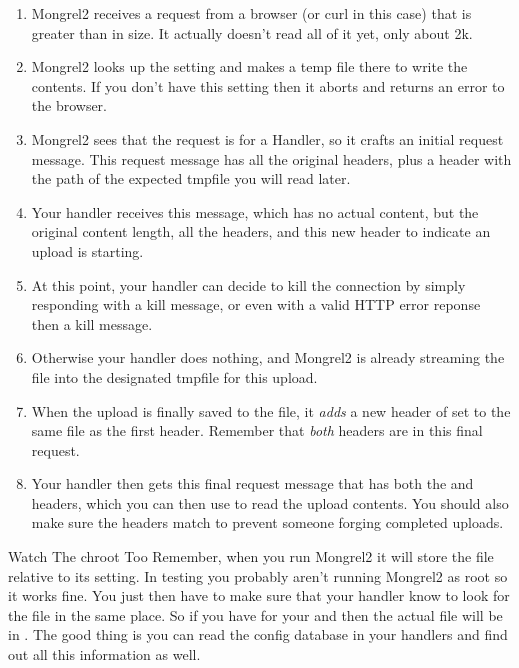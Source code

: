 \begin{enumerate}
\item Mongrel2 receives a request from a browser (or curl in this case) that is greater than  in size.  It actually doesn't read all of it yet, only about 2k.
\item Mongrel2 looks up the  setting and makes a temp file there to write the contents.  If you don't have this setting then it aborts and returns an error to the browser.
\item Mongrel2 sees that the request is for a Handler, so it crafts an initial request message.  This request message has all the original headers, plus a  header with the path of the expected tmpfile you will read later.
\item Your handler receives this message, which has no actual content, but the original content length, all the headers, and this new header to indicate an upload is starting.
\item At this point, your handler can decide to kill the connection by simply responding with a kill message, or even with a valid HTTP error reponse then a kill message.
\item Otherwise your handler does nothing, and Mongrel2 is already streaming the file into the designated tmpfile for this upload.
\item When the upload is finally saved to the file, it \emph{adds} a new header of  set to the same file as the first header.  Remember that \emph{both} headers are in this final request.
\item Your handler then gets this final request message that has both the  and  headers, which you can then use to read the upload contents.  You should also make sure the headers match to prevent someone forging completed uploads.
\end{enumerate}

\begin{aside}{Watch The chroot Too}
Remember, when you run Mongrel2 it will store the file relative to its  setting.  In testing you probably aren't
running Mongrel2 as root so it works fine.  You just then have to make sure that your handler know to look for the file in the
same place.  So if you have  for your  and  then the
actual file will be in .  The good thing is you can read the config database
in your handlers and find out all this information as well.
\end{aside}

